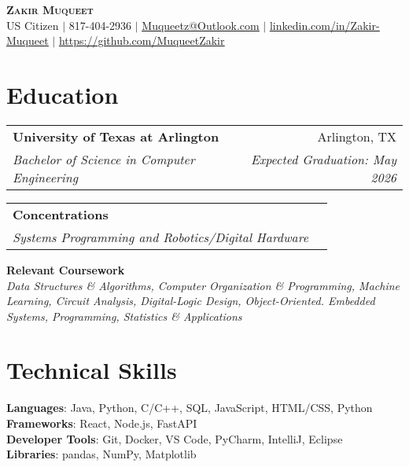 \documentclass[letterpaper,11pt]{article}
\makeatletter
\newcommand{\resumeSubheading}[4]{
  \vspace{-2pt}\item
    \begin{tabular*}{0.97\textwidth}[t]{l@{\extracolsep{\fill}}r}
      \textbf{#1} & #2 \\
      \textit{\small#3} & \textit{\small #4} \\
    \end{tabular*}\vspace{-7pt}
}
\newcommand{\resumeSubHeadingListStart}{\begin{itemize}[leftmargin=0.15in, label={}]}
\newcommand{\resumeSubHeadingListEnd}{\end{itemize}}
\makeatother
\begin{document}

\begin{center}
    \textbf{\Huge \scshape Zakir Muqueet} \\ \vspace{1pt}
  \small US Citizen $|$ \small 817-404-2936 $|$ \href{mailto:x@x.com}{\underline{Muqueetz@Outlook.com}} $|$ 
    \href{https://linkedin.com/in/...}{\underline{linkedin.com/in/Zakir-Muqueet}} $|$
    \href{https://github.com/...}{\underline{https://github.com/MuqueetZakir}}
\end{center}
\section{Education}
  \resumeSubHeadingListStart
    \resumeSubheading
      {University of Texas at Arlington}{Arlington, TX}
      {Bachelor of Science in Computer Engineering}{\textit{Expected Graduation: May 2026}}
    
    \resumeSubheading
      {Concentrations}{}{Systems Programming and Robotics/Digital Hardware}{}
     \small{\item{
      \textbf{Relevant Coursework}\\ \textit{Data Structures \& Algorithms, Computer Organization \& Programming, Machine Learning, Circuit Analysis, Digital-Logic Design, Object-Oriented. Embedded Systems, Programming, Statistics \& Applications}}
}
  \resumeSubHeadingListEnd
\section{Technical Skills}
 \begin{itemize}[leftmargin=0.15in, label={}]
    \small{\item{
     \textbf{Languages}{: Java, Python, C/C++, SQL, JavaScript, HTML/CSS, Python} \\
     \textbf{Frameworks}{: React, Node.js, FastAPI} \\
     \textbf{Developer Tools}{: Git, Docker, VS Code, PyCharm, IntelliJ, Eclipse} \\
     \textbf{Libraries}{: pandas, NumPy, Matplotlib}
    }}
     \end{itemize}
\end{document}
